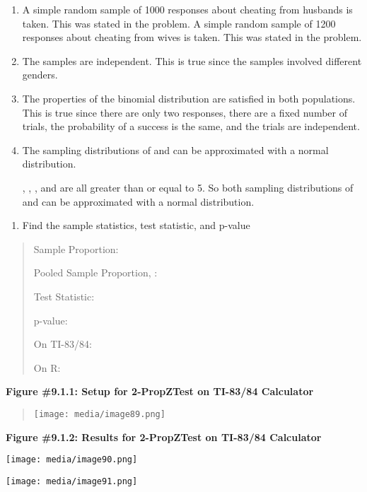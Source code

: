 \documentclass[]{book}
\providecommand{\tightlist}{%
  \setlength{\itemsep}{0pt}\setlength{\parskip}{0pt}}
\begin{document}
\begin{enumerate}
\def\labelenumi{\alph{enumi}.}
\item
  A simple random sample of 1000 responses about cheating from
  husbands is taken. This was stated in the problem. A simple random
  sample of 1200 responses about cheating from wives is taken. This
  was stated in the problem.
\item
  The samples are independent. This is true since the samples involved
  different genders.
\item
  The properties of the binomial distribution are satisfied in both
  populations. This is true since there are only two responses, there
  are a fixed number of trials, the probability of a success is the
  same, and the trials are independent.
\item
  The sampling distributions of and can be approximated with a normal
  distribution.

  , , , and are all greater than or equal to 5. So both sampling
  distributions of and can be approximated with a normal distribution.
\end{enumerate}

\begin{enumerate}
\def\labelenumi{\arabic{enumi}.}
\setcounter{enumi}{3}
\tightlist
\item
  Find the sample statistics, test statistic, and p-value
\end{enumerate}

\begin{quote}
Sample Proportion:

Pooled Sample Proportion, :

Test Statistic:

p-value:

On TI-83/84:

On R:
\end{quote}

\textbf{Figure \#9.1.1: Setup for 2-PropZTest on TI-83/84 Calculator}

\begin{quote}
\texttt{[image: media/image89.png]}
\end{quote}

\textbf{Figure \#9.1.2: Results for 2-PropZTest on TI-83/84 Calculator}

\texttt{[image: media/image90.png]}

\texttt{[image: media/image91.png]}
\end{document}
